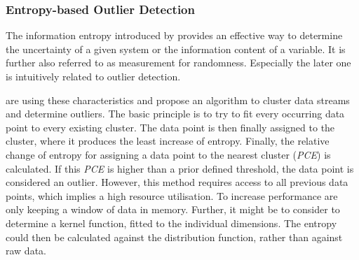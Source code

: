 \subsubsection{Entropy-based Outlier Detection}
\label{sec:background:network:novelty:entropy}

The information entropy introduced by \textcite{Shannon1948} provides an effective way to determine the uncertainty of a given system or the information content of a variable. It is further also referred to as measurement for randomness. Especially the later one is intuitively related to outlier detection.

\textcite{Toshniwal2014} are using these characteristics and propose an algorithm to cluster data streams and determine outliers. 
The basic principle is to try to fit every occurring data point to every existing cluster. The data point is then finally assigned to the cluster, where it produces the least increase of entropy. Finally, the relative change of entropy for assigning a data point to the nearest cluster (\emph{PCE}) is calculated. If this \emph{PCE} is higher than a prior defined threshold, the data point is considered an outlier.
However, this method requires access to all previous data points, which implies a high resource utilisation. To increase performance \textcite{Toshniwal2014} are only keeping a window of data in memory.
Further, it might be to consider to determine a kernel function, fitted to the individual dimensions. The entropy could then be calculated against the distribution function, rather than against raw data.

